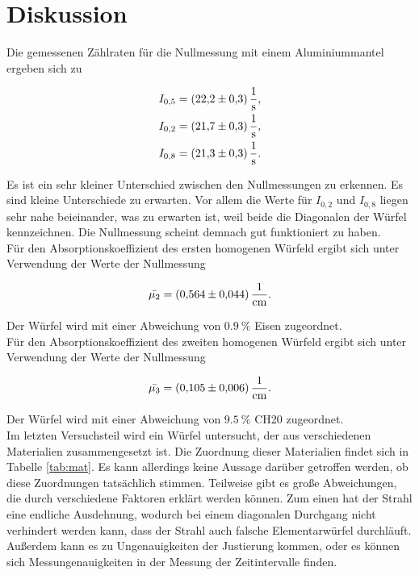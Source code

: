 \section{Diskussion}
\label{sec:Diskussion}

Die gemessenen Zählraten für die Nullmessung mit einem Aluminiummantel ergeben sich zu 

\vspace{-25pt}
\begin{align*}
    I_{0,5} &= \SI{22.2+-0.3}{\per\second},\\ 
    I_{0,2} &= \SI{21.7+-0.3}{\per\second},\\ 
    I_{0,8} &= \SI{21.3+-0.3}{\per\second}.   
\end{align*}

Es ist ein sehr kleiner Unterschied zwischen den Nullmessungen zu erkennen. Es sind kleine Unterschiede zu erwarten. Vor allem 
die Werte für $I_{0,2}$ und $I_{0,8}$ liegen sehr nahe beieinander, was zu erwarten ist, weil beide die Diagonalen der Würfel kennzeichnen. 
Die Nullmessung scheint demnach gut funktioniert zu haben.\\

Für den Absorptionskoeffizient des ersten homogenen Würfeld ergibt sich unter Verwendung der Werte der Nullmessung 

\vspace{-5pt}
\begin{equation*}
    \bar{\mu_2} = \SI{0.564+-0.044}{\per\centi\metre}. 
\end{equation*}

Der Würfel wird mit einer Abweichung von $\SI{0.9}{\percent}$ Eisen zugeordnet.\\

Für den Absorptionskoeffizient des zweiten homogenen Würfeld ergibt sich unter Verwendung der Werte der Nullmessung 

\vspace{-5pt}
\begin{equation*}
    \bar{\mu_3} = \SI{0.105+-0.006}{\per\centi\metre}. 
\end{equation*}

Der Würfel wird mit einer Abweichung von $\SI{9.5}{\percent}$ CH20 zugeordnet.\\

Im letzten Versuchsteil wird ein Würfel untersucht, der aus verschiedenen Materialien zusammengesetzt ist. Die Zuordnung 
dieser Materialien findet sich in Tabelle \ref{tab:mat}. Es kann allerdings keine Aussage darüber getroffen werden, ob diese
Zuordnungen tatsächlich stimmen. Teilweise gibt es große Abweichungen, die durch verschiedene Faktoren erklärt werden können. 
Zum einen hat der Strahl eine endliche Ausdehnung, wodurch bei einem diagonalen Durchgang nicht verhindert werden kann, dass 
der Strahl auch falsche Elementarwürfel durchläuft. Außerdem kann es zu Ungenauigkeiten der Justierung kommen, oder es können
sich Messungenauigkeiten in der Messung der Zeitintervalle finden. 

